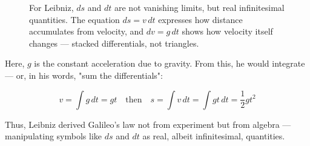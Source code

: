 \begin{figure}[H]
\centering
{}
\caption{For Leibniz, $ds$ and $dt$ are not vanishing limits, but real infinitesimal quantities. The equation $ds = v\,dt$ expresses how distance accumulates from velocity, and $dv = g\,dt$ shows how velocity itself changes — stacked differentials, not triangles.}
\end{figure}


Here, $g$ is the constant acceleration due to gravity. From this, he would integrate — or, in his words, "sum the differentials":

\[
v = \int g\,dt = g t
\quad \text{then} \quad
s = \int v\,dt = \int g t\,dt = \frac{1}{2}gt^2
\]

Thus, Leibniz derived Galileo’s law not from experiment but from algebra — manipulating symbols like $ds$ and $dt$ as real, albeit infinitesimal, quantities.

